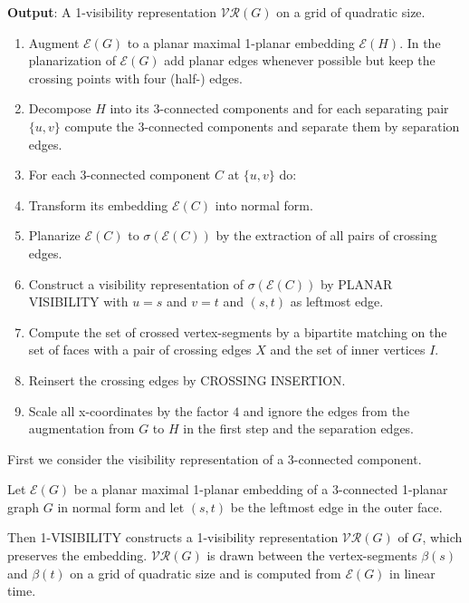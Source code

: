 \documentclass[runningheads]{llncs}
\begin{document}
\textbf{Output}: A 1-visibility representation $\mathcal{VR}(G)$ on
a grid of quadratic size.

\begin{enumerate}
  \item Augment $\mathcal{E}(G)$ to a planar maximal 1-planar embedding $\mathcal{E}(H)$.
  In the planarization of $\mathcal{E}(G)$ add planar edges
  whenever possible but keep the crossing points with four
  (half-) edges.
  \item Decompose $H$ into its 3-connected components and for each
   separating pair $\{u,v\}$ compute the 3-connected components
   and separate them by separation edges.
  \item For each 3-connected component $C$ at  $\{u,v\}$ do:
      \item Transform its embedding $\mathcal{E}(C)$ into normal
      form.
  \item Planarize $\mathcal{E}(C)$  to  $\sigma (\mathcal{E}(C))$
  by the extraction of  all pairs of crossing  edges.
  \item Construct a visibility representation of $\sigma (\mathcal{E}(C))$
  by PLANAR VISIBILITY with $u=s$ and $v=t$ and $(s,t)$ as
  leftmost edge.
  \item Compute the set of crossed vertex-segments by a
  bipartite matching on the set of faces with a pair of crossing
  edges $X$ and the set of inner vertices $I$.
  \item Reinsert the crossing edges by CROSSING INSERTION.
  \item Scale all x-coordinates by the factor $4$ and ignore the edges from the augmentation
  from $G$ to $H$ in the first step and the separation edges.
\end{enumerate}




First we consider the visibility representation of a 3-connected
component.

\begin{theorem}
Let $\mathcal{E}(G)$ be a planar maximal 1-planar embedding of a
3-connected 1-planar graph  $G$ in normal form and let $(s,t)$ be
the leftmost edge in the outer face.

Then 1-VISIBILITY constructs a 1-visibility representation
$\mathcal{VR}(G)$ of $G$, which preserves the embedding.
$\mathcal{VR}(G)$ is drawn between the vertex-segments $\beta(s)$
and $\beta(t)$ on a grid of quadratic size and is computed from
$\mathcal{E}(G)$ in linear time.
\end{theorem}
\end{document}

